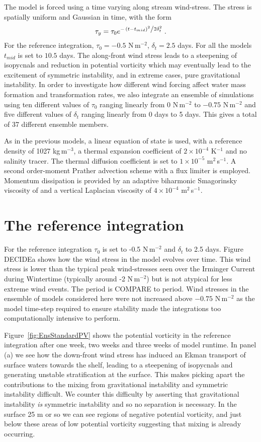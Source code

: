 The model is forced using a time varying along stream wind-stress. The stress is spatially uniform and Gaussian in time, with the form
\begin{equation}
    \tau_y = \tau_0 e^{-\flatfrac{(t - t_{mid})^2}{2\delta_t^2}} \, .
\end{equation}
For the reference integration, $\tau_0 = - 0.5$ N\,m$^{-2}$, $\delta_t = 2.5$ days. For all the models $t_{mid}$ is set to $10.5$ days. The along-front wind stress leads to a steepening of isopycnals and reduction in potential vorticity which may eventually lead to the excitement of symmetric instability, and in extreme cases, pure gravitational instability. In order to investigate how different wind forcing affect water mass formation and transformation rates, we also integrate an ensemble of simulations using ten different values of $\tau_0$ ranging linearly from $0$ N\,m$^{-2}$ to $-0.75$ N\,m$^{-2}$ and five different values of $\delta_t$ ranging linearly from 0 days to 5 days. This gives a total of 37 different ensemble members.

As in the previous models, a linear equation of state is used, with a reference density of 1027 kg\,m$^{-3}$, a thermal expansion coefficient of $2 \times 10^{-4}$ K$^{-1}$ and no salinity tracer. The thermal diffusion coefficient is set to $1 \times 10^{-5}$ m$^2$\,s$^{-1}$. A second order-moment Prather advection scheme with a flux limiter is employed. Momentum dissipation is provided by an adaptive biharmonic Smagorinsky viscosity of and a vertical Laplacian viscosity of $4 \times 10^{-4}$ m$^2$\,s$^{-1}$.  

\section{The reference integration}
\label{sec:IrmRef}
For the reference integration $\tau_0$ is set to -0.5 N\,m$^{-2}$ and $\delta_t$ to 2.5 days. Figure DECIDEa shows how the wind stress in the model evolves over time. This wind stress is lower than the typical peak wind-stresses seen over the Irminger Current during Wintertime (typically around -2 N\,m$^{-2}$) but is not atypical for less extreme wind events. The period is COMPARE to period. Wind stresses in the ensemble of models considered here were not increased above $-0.75$ N\,m$^{-2}$ as the model time-step required to ensure stability made the integrations too computationally intensive to perform.

Figure~\ref{fig:EnsStandardPV} shows the potential vorticity in the reference integration after one week, two weeks and three weeks of model runtime. In panel (a) we see how the down-front wind stress has induced an Ekman transport of surface waters towards the shelf, leading to a steepening of isopycnals and generating unstable stratification at the surface. This makes picking apart the contributions to the mixing from gravitational instability and symmetric instability difficult. We counter this difficulty by asserting that gravitational instability \textit{is} symmetric instability and so no separation is necessary. In the surface 25 m or so we can see regions of negative potential vorticity, and just below these areas of low potential vorticity suggesting that mixing is already occurring.

